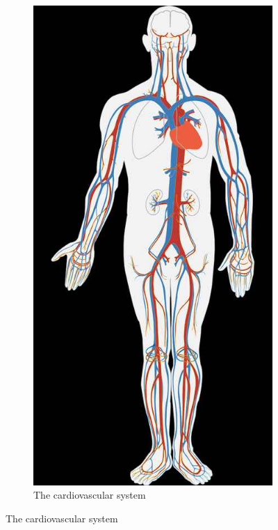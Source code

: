 \documentclass[]{article}
\begin{document}
\begin{figure}[H]
	\caption{Distributing Energy}
	\begin{subfigure}[t]{0.4\textwidth}
		\caption{The cardiovascular system}\label{fig:distribution1}
		\includegraphics[width=\textwidth]{distribution1}

\end{subfigure}
\end{figure}
\end{document}
